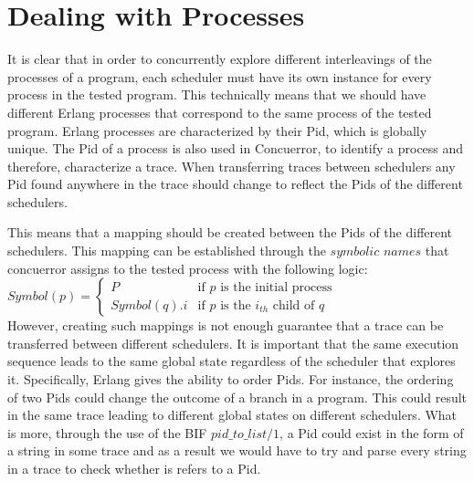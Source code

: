 \section{Dealing with Processes}

It is clear that in order to concurrently explore different interleavings of the processes of a program, each scheduler
must have its own instance for every process in the tested program. This technically means that we should have different Erlang processes
that correspond to the same process of the tested program. Erlang processes are characterized by their Pid, which is globally unique.
The Pid of a process is also used in Concuerror, to identify a process and therefore, characterize a trace. When transferring traces
between schedulers any Pid found anywhere in the trace should change to reflect the Pids of the different schedulers.  

This means that a mapping should be created between the Pids of the different schedulers. This mapping can be established through
the $symbolic$ $names$ that concuerror assigns to the tested process with the following logic:
\\

$ Symbol(p) =
\left\{
    \begin{array}{ll}
        P               &   \mbox{if $p$ is the initial process} \\
        Symbol(q).i     &   \mbox{if $p$ is the  $i_{th}$ child of $q$}
    \end{array}
\right.$
\\

However, creating such mappings is not enough guarantee that a trace can be transferred between different schedulers. It is important
that the same execution sequence leads to the same global state regardless of the scheduler that explores it. Specifically, Erlang
gives the ability to order Pids. For instance, the ordering of two Pids could change the outcome of a branch in a program. This could 
result in the same trace leading to different global states on different schedulers. What is more, through the use
of the BIF $pid\_to\_list/1$, a Pid could exist in the form of a string in some trace and as a result we would have to try and parse
every string in a trace to check whether is refers to a Pid.

